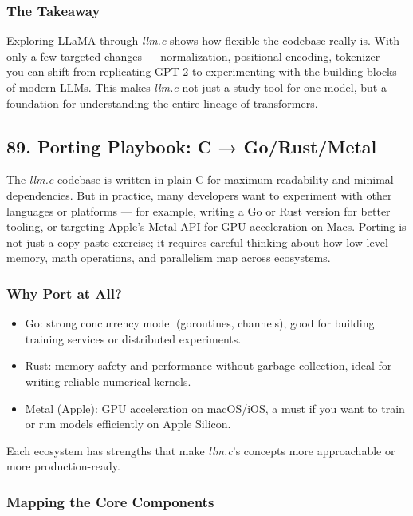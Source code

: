 \documentclass[
  letterpaper,
  DIV=11,
  numbers=noendperiod]{scrreprt}
\providecommand{\tightlist}{%
  \setlength{\itemsep}{0pt}\setlength{\parskip}{0pt}}
\begin{document}
\subsubsection{The Takeaway}\label{the-takeaway-77}

Exploring LLaMA through \emph{llm.c} shows how flexible the codebase
really is. With only a few targeted changes --- normalization,
positional encoding, tokenizer --- you can shift from replicating GPT-2
to experimenting with the building blocks of modern LLMs. This makes
\emph{llm.c} not just a study tool for one model, but a foundation for
understanding the entire lineage of transformers.

\subsection{89. Porting Playbook: C →
Go/Rust/Metal}\label{porting-playbook-c-gorustmetal}

The \emph{llm.c} codebase is written in plain C for maximum readability
and minimal dependencies. But in practice, many developers want to
experiment with other languages or platforms --- for example, writing a
Go or Rust version for better tooling, or targeting Apple's Metal API
for GPU acceleration on Macs. Porting is not just a copy-paste exercise;
it requires careful thinking about how low-level memory, math
operations, and parallelism map across ecosystems.

\subsubsection{Why Port at All?}\label{why-port-at-all}

\begin{itemize}
\tightlist
\item
  Go: strong concurrency model (goroutines, channels), good for building
  training services or distributed experiments.
\item
  Rust: memory safety and performance without garbage collection, ideal
  for writing reliable numerical kernels.
\item
  Metal (Apple): GPU acceleration on macOS/iOS, a must if you want to
  train or run models efficiently on Apple Silicon.
\end{itemize}

Each ecosystem has strengths that make \emph{llm.c}'s concepts more
approachable or more production-ready.

\subsubsection{Mapping the Core
Components}\label{mapping-the-core-components}
\end{document}
